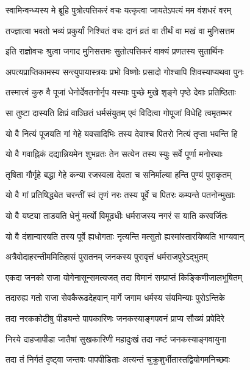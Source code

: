 
\twolineshloka
{स्वामिन्वन्ध्यस्य मे ब्रूहि पुत्रोत्पत्तिकरं वचः}
{यत्कृत्वा जायतेऽपत्यं मम वंशधरं वरम्}%

\twolineshloka
{तज्ज्ञात्वा भवतो भव्यं प्रकुर्यां निश्चितं वचः}
{दानं व्रतं वा तीर्थं वा मखं वा मुनिसत्तम}%

\twolineshloka
{इति राज्ञोवचः श्रुत्वा जगाद मुनिसत्तमः}
{सुतोत्पत्तिकरं वाक्यं प्रणतस्य सुतार्थिनः}%

\twolineshloka
{अपत्यप्राप्तिकामस्य सन्त्युपायास्त्रयः प्रभो}
{विष्णोः प्रसादो गोश्चापि शिवस्याप्यथवा पुनः}%

\twolineshloka
{तस्मात्त्वं कुरु वै पूजां धेनोर्देवतनोर्नृप}
{यस्याः पुच्छे मुखे शृङ्गे पृष्ठे देवाः प्रतिष्ठिताः}%

\twolineshloka
{सा तुष्टा दास्यति क्षिप्रं वाञ्छितं धर्मसंयुतम्}
{एवं विदित्वा गोपूजां विधेहि त्वमृतम्भर}%

\twolineshloka
{यो वै नित्यं पूजयति गां गेहे यवसादिभिः}
{तस्य देवाश्च पितरो नित्यं तृप्ता भवन्ति हि}%

\twolineshloka
{यो वै गवाह्निकं दद्यान्नियमेन शुभव्रतः}
{तेन सत्येन तस्य स्युः सर्वे पूर्णा मनोरथाः}%

\twolineshloka
{तृषिता गौर्गृहे बद्धा गेहे कन्या रजस्वला}
{देवता च सनिर्माल्या हन्ति पुण्यं पुराकृतम्}%

\twolineshloka
{यो वै गां प्रतिषिद्ध्येत चरन्तीं स्वं तृणं नरः}
{तस्य पूर्वे च पितरः कम्पन्ते पतनोन्मुखाः}%

\twolineshloka
{यो वै यष्ट्या ताडयति धेनुं मर्त्यो विमूढधीः}
{धर्मराजस्य नगरं स याति करवर्जितः}%

\twolineshloka
{यो वै दंशान्वारयति तस्य पूर्वे ह्यधोगताः}
{नृत्यन्ति मत्सुतो ह्यस्मांस्तारयिष्यति भाग्यवान्}%

\twolineshloka
{अत्रैवोदाहरन्तीममितिहासं पुरातनम्}
{जनकस्य पुरावृत्तं धर्मराजपुरेऽद्भुतम्}%

\twolineshloka
{एकदा जनको राजा योगेनासून्समत्यजत्}
{तदा विमानं सम्प्राप्तं किङ्किणीजालभूषितम्}%

\twolineshloka
{तदारुह्य गतो राजा सेवकैरूढदेहवान्}
{मार्गे जगाम धर्मस्य संयमिन्याः पुरोऽन्तिके}%

\twolineshloka
{तदा नरककोटीषु पीड्यन्ते पापकारिणः}
{जनकस्याङ्गपवनं प्राप्य सौख्यं प्रपेदिरे}%

\twolineshloka
{निरये दाहजापीडा जातैषां सुखकारिणी}
{महादुःखं तदा नष्टं जनकस्याङ्गवायुना}%

\twolineshloka
{तदा तं निर्गतं दृष्ट्वा जन्तवः पापपीडिताः}
{अत्यन्तं चुक्रुशुर्भीतास्तद्वियोगमनिच्छवः}%

